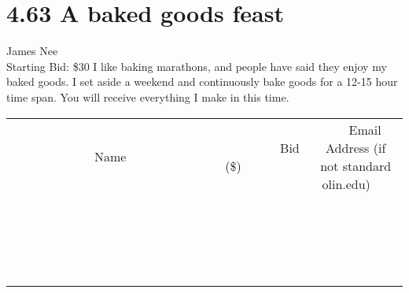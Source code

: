 \documentclass[11pt]{article}
\begin{document}
\section*{4.63 A baked goods feast}
James Nee
\\
Starting Bid: \$30
\newline
I like baking marathons, and people have said they enjoy my baked goods. I set aside a weekend and continuously bake goods for a 12-15 hour time span. You will receive everything I make in this time.
\\[3ex]
\begin{tabular}{c c c}
~~~~~~~~~~~~~Name~~~~~~~~~~~~~ & ~~~~~~~~~Bid (\$)~~~~~~~~~  & ~~~Email Address (if not standard olin.edu)~~~\\
 & & \\
\hline
 & & \\
\hline
 & & \\
\hline
 & & \\
\hline
 & & \\
\hline
 & & \\
\hline
 & & \\
\hline
 & & \\
\hline
 & & \\
\hline
 & & \\
\hline
 & & \\
\hline
 & & \\
\hline
 & & \\
\hline
 & & \\
\hline
 & & \\
\hline
 & & \\
\hline
 & & \\
\hline
 & & \\
\hline
 & & \\
\hline
\end{tabular}
\newpage
\end{document}
